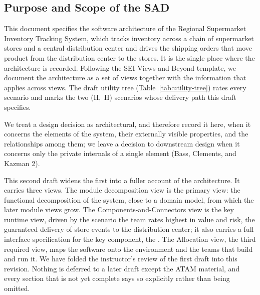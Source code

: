 \subsection{Purpose and Scope of the SAD}
\label{sec:purpose-scope}

This document specifies the software architecture of the Regional Supermarket
Inventory Tracking System, which tracks inventory across a chain of supermarket
stores and a central distribution center and drives the shipping orders that move
product from the distribution center to the stores. It is the single place where
the architecture is recorded. Following the SEI Views and Beyond template, we
document the architecture as a set of views together with the information that
applies across views. The draft utility tree (Table~\ref{tab:utility-tree}) rates
every scenario and marks the two (H,~H) scenarios whose delivery path this draft
specifies.

We treat a design decision as architectural, and therefore record it here, when it
concerns the elements of the system, their externally visible properties, and the
relationships among them; we leave a decision to downstream design when it concerns
only the private internals of a single element (Bass, Clements, and Kazman 2).

This second draft widens the first into a fuller account of the architecture. It
carries three views. The module decomposition view is the primary view: the
functional decomposition of the system, close to a domain model, from which the later
module views grow. The Components-and-Connectors view is the key runtime view, driven
by the scenario the team rates highest in value and risk, the guaranteed delivery of
store events to the distribution center; it also carries a full interface
specification for the key component, the \CFE. The Allocation view, the third required
view, maps the software onto the environment and the teams that build and run it. We
have folded the instructor's review of the first draft into this revision. Nothing is
deferred to a later draft except the ATAM material, and every section that is not yet
complete says so explicitly rather than being omitted.
